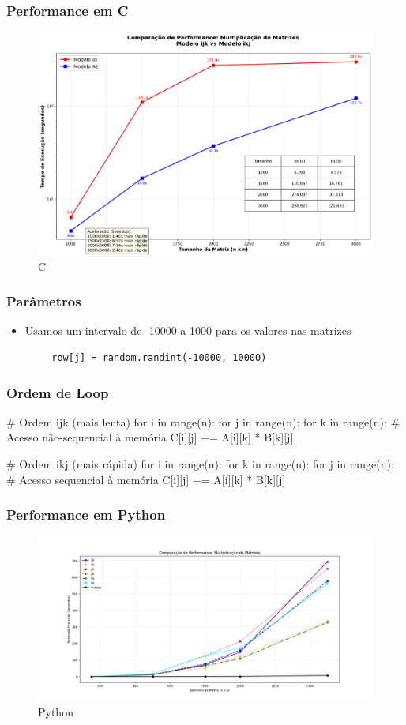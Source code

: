 \documentclass[utf8]{beamer}
\theoremstyle{definition}
\begin{document}
\begin{frame}
	\frametitle{Performance em C}
	\begin{figure}[H]
		\centering
		\includegraphics[width=0.65\linewidth]{Figuras/performance_multiplicacao_matrizes}
		\caption{C}
		\label{fig:performace_c}
	\end{figure}
	
\end{frame}

\begin{frame}[fragile]
	\frametitle{Parâmetros}
	\begin{itemize}
		\item Usamos um intervalo de -10000 a 1000 para os valores nas matrizes
	\end{itemize}
	\begin{lstlisting}
		row[j] = random.randint(-10000, 10000)
	\end{lstlisting}

\end{frame}

\begin{frame}[fragile]
	\frametitle{Ordem de Loop}
	\begin{semiverbatim}
		# Ordem ijk (mais lenta)
		for i in range(n):
		   for j in range(n):
		      for k in range(n):  # Acesso não-sequencial à memória
		        C[i][j] += A[i][k] * B[k][j]
		
		# Ordem ikj (mais rápida)
		for i in range(n):
		   for k in range(n):
		      for j in range(n):  # Acesso sequencial à memória
		         C[i][j] += A[i][k] * B[k][j]
	\end{semiverbatim}
\end{frame}

\begin{frame}
	\frametitle{Performance em Python}
	\begin{figure}[H]
		\centering
		\includegraphics[width=0.80\linewidth]{Figuras/cachemiss_python}
		\caption{Python}
		\label{fig:performace_python}
	\end{figure}
\end{frame}
\end{document}

